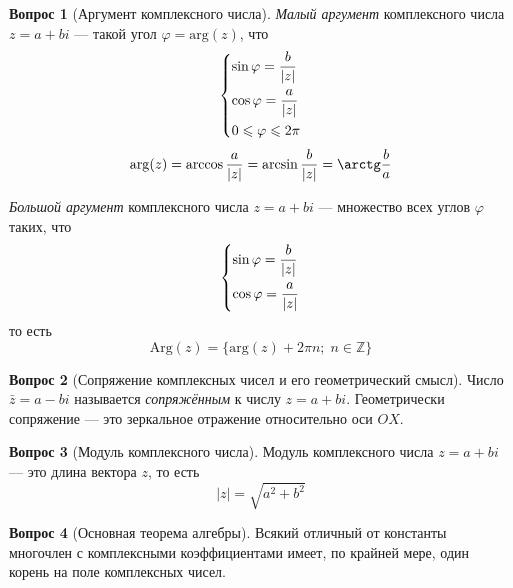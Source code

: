 \documentclass[a4paper,11pt]{article}
\theoremstyle{remark}
\theoremstyle{definition}
\newtheorem{question}{Вопрос}
\begin{document}
\begin{question}[Аргумент комплексного числа]
\emph{Малый аргумент} комплексного числа \(z = a + bi\) --- такой угол \(\varphi =  \mathrm{arg}(z)\), что 
\begin{equation*}
	\begin{dcases}
		\sin \varphi = \frac{b}{|z|} \\
		\cos \varphi = \frac{a}{|z|} \\
		0 \leqslant \varphi \leqslant 2\pi
	\end{dcases}
\end{equation*}
\begin{equation*}
	\mathrm{arg}(z) = \arccos \frac{a}{|z|} = \arcsin \frac{b}{|z|} = \arctg \frac{b}{a}
\end{equation*}

\emph{Большой аргумент} комплексного числа \(z = a + bi\) --- множество всех углов \(\varphi\) таких, что
\begin{equation*}
	\begin{dcases}
		\sin \varphi = \frac{b}{|z|} \\
		\cos \varphi = \frac{a}{|z|} 
	\end{dcases}
\end{equation*}
то есть
\begin{equation*}
	\mathrm{Arg}(z) = \{\mathrm{arg}(z) + 2\pi{}n;\;n \in \mathbb{Z}\}
\end{equation*}
\end{question}
	

\begin{question}[Сопряжение комплексных чисел и его геометрический смысл]
Число \(\bar{z} = a - bi\) называется \emph{сопряжённым} к числу \(z = a + bi\). Геометрически сопряжение --- это зеркальное отражение относительно оси \(OX\).
\end{question}



\begin{question}[Модуль комплексного числа]
Модуль комплексного числа \(z = a + bi\) --- это длина вектора \(z\), то есть 
\begin{equation*}
	|z| = \sqrt{a^2 + b^2}
\end{equation*}
\end{question}


\begin{question}[Основная теорема алгебры]
Всякий отличный от константы многочлен с комплексными коэффициентами имеет, по крайней мере, один корень на поле комплексных чисел.
\end{question}
\end{document}
